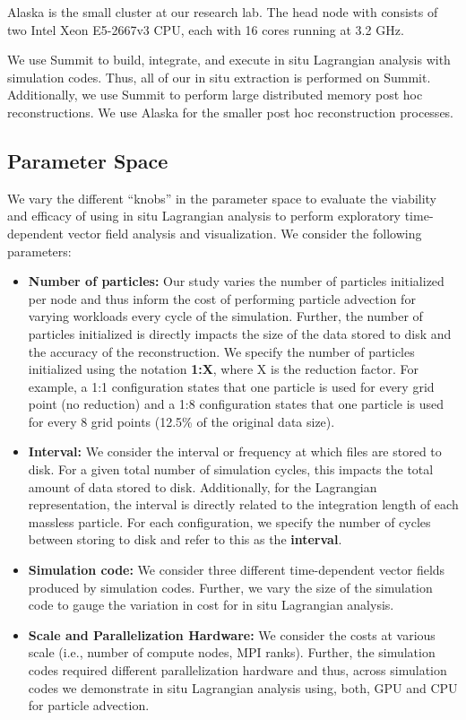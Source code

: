 Alaska is the small cluster at our research lab.
%
The head node with consists of two Intel Xeon E5-2667v3 CPU, each with 16 cores running at 3.2 GHz. 

We use Summit to build, integrate, and execute in situ Lagrangian analysis with simulation codes.
%
Thus, all of our in situ extraction is performed on Summit. 
%
Additionally, we use Summit to perform large distributed memory post hoc reconstructions.
%
We use Alaska for the smaller post hoc reconstruction processes.


\subsection{Parameter Space}
\label{sec:parameters}

We vary the different ``knobs'' in the parameter space to evaluate the viability and efficacy of using in situ Lagrangian analysis to perform exploratory time-dependent vector field analysis and visualization. 
%
We consider the following parameters:
\begin{itemize}
\item \textbf{Number of particles:} Our study varies the number of particles initialized per node and thus inform the cost of performing particle advection for varying workloads every cycle of the simulation. Further, the number of particles initialized is directly impacts the size of the data stored to disk and the accuracy of the reconstruction.
%
We specify the number of particles initialized using the notation \textbf{1:X}, where X is the reduction factor. 
%
For example, a 1:1 configuration states that one particle is used for every grid point (no reduction) and a 1:8 configuration states that one particle is used for every 8 grid points (12.5\% of the original data size). 
%
\item \textbf{Interval:} We consider the interval or frequency at which files are stored to disk. 
%
For a given total number of simulation cycles, this impacts the total amount of data stored to disk. 
%
Additionally, for the Lagrangian representation, the interval is directly related to the integration length of each massless particle. 
%
For each configuration, we specify the number of cycles between storing to disk and refer to this as the \textbf{interval}. 
%
\item \textbf{Simulation code:} We consider three different time-dependent vector fields produced by simulation codes. Further, we vary the size of the simulation code to gauge the variation in cost for in situ Lagrangian analysis. 
\item \textbf{Scale and Parallelization Hardware:} We consider the costs at various scale (i.e., number of compute nodes, MPI ranks). Further, the simulation codes required different parallelization hardware and thus, across simulation codes we demonstrate in situ Lagrangian analysis using, both, GPU and CPU for particle advection.
\end{itemize}

